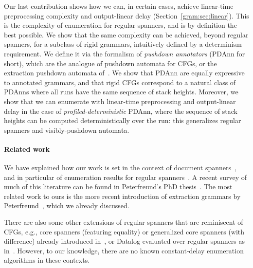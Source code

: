 
    Our last contribution shows how we can, in certain cases, achieve linear-time preprocessing complexity and output-linear delay (Section~\ref{gram:sec:linear}). This is the complexity of enumeration for regular spanners, and is by definition the best possible. We show that the same complexity can be achieved, beyond regular spanners, for a subclass of rigid grammars, intuitively defined by a determinism requirement. We define it via the formalism of \emph{pushdown annotators} (PDAnn for short), which are the analogue of pushdown automata for CFGs, or the extraction pushdown automata of~\cite{Peterfreund21}. We show that PDAnn are equally expressive to annotated grammars, and that rigid CFGs correspond to a natural class of PDAnns where all runs have the same sequence of stack heights. Moreover, 
    we show that we can enumerate with linear-time preprocessing and output-linear delay in the case of \emph{profiled-deterministic} PDAnn, where the sequence of stack heights can be computed deterministically over the run: this generalizes regular spanners and visibly-pushdown automata.


\paragraph{Related work}
We have explained how our work is set in the context of document spanners~\cite{FaginKRV15}, and in particular of enumeration results for regular spanners~\cite{FlorenzanoRUVV18,amarilli2019constant}. A recent survey of much of this literature can be found in Peterfreund's PhD thesis~\cite{peterfreund2019complexity}. The most related work to ours is the more recent introduction of extraction grammars by Peterfreund~\cite{Peterfreund21}, which we already discussed.
%

There are also some other extensions of regular spanners that are reminiscent of CFGs, e.g., core spanners (featuring equality) or generalized core spanners (with difference) already introduced in~\cite{FaginKRV15}, or Datalog evaluated over regular spanners as in~\cite{peterfreund2019recursive}. However, to our knowledge, there are no known constant-delay enumeration algorithms in these contexts.

